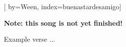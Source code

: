 
[%
    by={Ween},
    index={buenastardesamigo}]


    \label{buenastardesamigo}

    \textbf{Note: this song is not yet finished!}

    \beginverse
        Example verse ...
    \endverse
\endsong
